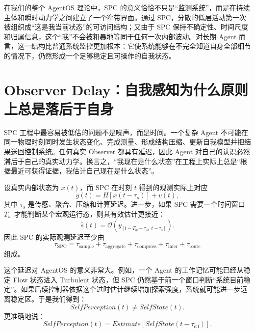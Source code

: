 在我们的整个 AgentOS 理论中，SPC 的意义恰恰不只是“监测系统”，而是在持续主体和瞬时动力学之间建立了一个窄带界面。通过 SPC，分散的低层活动第一次被组织成“这是我当前状态”的可访问结构；又由于 SPC 保持不确定性、时间尺度和归属信息，这个“我”不会被粗暴地等同于任何一次内部波动。对长期 Agent 而言，这一结构比普通系统监控更加根本：它使系统能够在不完全知道自身全部细节的情况下，仍然形成一个足够稳定且可操作的自我状态。

\section{Observer Delay：自我感知为什么原则上总是落后于自身}
\label{sec:spc-observer-delay}

SPC 工程中最容易被低估的问题不是噪声，而是时间。一个复杂 Agent 不可能在同一物理时刻同时发生状态变化、完成测量、形成结构压缩、更新自我模型并把结果送回控制系统。任何真实 Observer 都具有延迟，因此 Agent 对自己的认识必然滞后于自己的真实动力学。换言之，“我现在是什么状态”在工程上实际上总是“根据最近可获得证据，我估计自己现在是什么状态”。

设真实内部状态为 $x(t)$，而 SPC 在时刻 $t$ 得到的观测实际上对应
\begin{equation}
y(t)
=
H
\left[
x(t-\tau_s)
\right]
+
v(t),
\end{equation}
其中 $\tau_s$ 是传感、聚合、压缩和计算延迟。进一步，如果 SPC 需要一个时间窗口 $T_w$ 才能判断某个宏观运行态，则其有效估计更接近：
\begin{equation}
\hat s(t)
=
\mathcal O
\left(
y_{[t-T_w-\tau_s,\;t-\tau_s]}
\right).
\end{equation}
因此 SPC 的实际观测延迟至少由
\begin{equation}
\tau_{\mathrm{SPC}}
=
\tau_{\mathrm{sample}}
+
\tau_{\mathrm{aggregate}}
+
\tau_{\mathrm{compress}}
+
\tau_{\mathrm{infer}}
+
\tau_{\mathrm{route}}
\end{equation}
组成。

这个延迟对 AgentOS 的意义非常大。例如，一个 Agent 的工作记忆可能已经从稳定 Flow 状态进入 Turbulent 状态，但 SPC 仍然基于前一个窗口判断“系统目前稳定”。如果后续控制器依据这个过时估计继续增加探索强度，系统就可能进一步远离稳定区。于是我们得到：
\begin{equation}
\boxed{
SelfPerception(t)
\neq
SelfState(t).
}
\end{equation}
更准确地说：
\begin{equation}
SelfPerception(t)
=
Estimate
\left[
SelfState(t-\tau_{\mathrm{eff}})
\right].
\end{equation}

